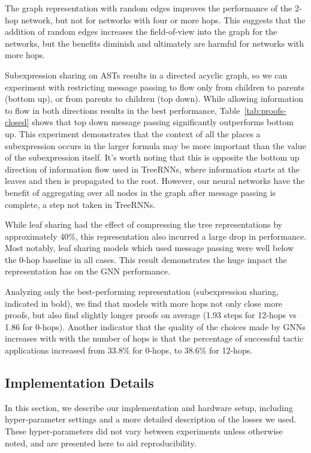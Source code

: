 \documentclass[letterpaper]{article} \usepackage{aaai20}  \usepackage{times}  \usepackage{helvet} \usepackage{courier}  \usepackage[hyphens]{url}  \usepackage{graphicx} \urlstyle{rm} \def\UrlFont{\rm}  \usepackage{graphicx}  \frenchspacing  \setlength{\pdfpagewidth}{8.5in}  \setlength{\pdfpageheight}{11in}
\newcommand{\todo}[1]{}
\begin{document}
The graph representation with random edges improves the performance of the 2-hop network, but not for networks with four or more hops. This suggests that the addition of random edges increases the field-of-view into the graph for the networks, but the benefits diminish and ultimately are harmful for networks with more hops.

Subexpression sharing on ASTs results in a directed acyclic graph, so we can experiment with restricting message passing to flow only from children to parents (bottom up), or from parents to children (top down).
While allowing information to flow in both directions results in the best performance, Table~\ref{tab:proofs-closed} shows that top down message passing significantly outperforms bottom up.
This experiment demonstrates that the context of all the places a subexpression occurs in the larger formula may be more important than the value of the subexpression itself.
It's worth noting that this is opposite the bottom up direction of information flow used in TreeRNNs, where information starts at the leaves and then is propagated to the root.
However, our neural networks have the benefit of aggregating over all nodes in the graph after message passing is complete, a step not taken in TreeRNNs.

While leaf sharing had the effect of compressing the tree representations by approximately 40\%, this representation also incurred a large drop in performance.
Most notably, leaf sharing models which used message passing were well below the 0-hop baseline in all cases.
This result demonstrates the huge impact the representation has on the GNN performance.

Analyzing only the best-performing representation (subexpression sharing, indicated in bold), we find that models with more hops not only close more proofs, but also find slightly longer proofs on average (1.93 steps for 12-hops vs 1.86 for 0-hops).
Another indicator that the quality of the choices made by GNNs increases with with the number of hops is that the percentage of successful tactic applications increased from 33.8\% for 0-hops, to 38.6\% for 12-hops.  








\subsection{Implementation Details}
In this section, we describe our implementation and hardware setup, including hyper-parameter settings and a more detailed description of the losses we used. These hyper-parameters did not vary between experiments unless otherwise noted, and are presented here to aid reproducibility. 
\todo{Discuss hyperparameter sweep/give some indication that these params are reasonable.}
\end{document}
